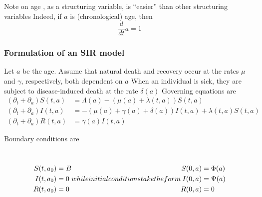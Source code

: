 \documentclass[aspectratio=169]{beamer}\usepackage[]{graphicx}\usepackage[]{xcolor}
\begin{document}

\begin{frame}{Note on age}
, as a structuring variable, is ``easier'' than other structuring variables
\vfill
Indeed, if $a$ is (chronological) age, then
\[
\frac{d}{dt}a = 1
\]
\end{frame}


\begin{frame}\frametitle{Formulation of an SIR model}
Let $a$ be the age. Assume that natural death and recovery occur at the rates $\mu$ and $\gamma$, respectively, both dependent on $a$
\vfill
When an individual is sick, they are subject to disease-induced death at the rate $\delta(a)$
\vfill
Governing equations are
\footnotesize
\begin{subequations}\label{sys:SIR_age_structure}
\begin{align}
(\partial_t+\partial_a)S(t,a) &=
\Lambda(a)-(\mu(a)+\lambda(t,a))S(t,a)
\label{sys:SIR_age_structure_S} \\
(\partial_t+\partial_a)I(t,a) &=
-(\mu(a)+\gamma(a)+\delta(a))I(t,a)+\lambda(t,a)S(t,a)
\label{sys:SIR_age_structure_I} \\
(\partial_t+\partial_a)R(t,a) &=
\gamma(a)I(t,a)
\label{sys:SIR_age_structure_R}
\end{align}
\end{subequations}
\end{frame}

\begin{frame}
Boundary conditions are
\addtocounter{equation}{-1}\
\begin{subequations}
\setcounter{equation}{3}
\begin{align}
S(t,a_0)&=B \label{sys:SIR_age_structure_BCS} \\
I(t,a_0)&=0 \label{sys:SIR_age_structure_BCI} \\
R(t,a_0)&=0 \label{sys:SIR_age_structure_BCR}
\end{align}
while initial conditions take the form
\begin{align}
S(0,a)&=\Phi(a) \label{sys:SIR_age_structure_ICS} \\
I(0,a)&=\Psi(a) \label{sys:SIR_age_structure_ICI} \\
R(0,a)&=0 \label{sys:SIR_age_structure_ICR}
\end{align}
\end{subequations}
\end{frame}
\end{document}
